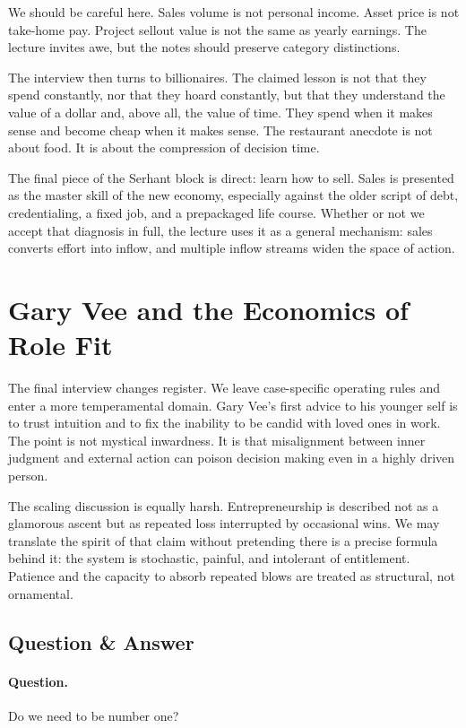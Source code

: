 We should be careful here. Sales volume is not personal income. Asset price is not take-home pay. Project sellout value is not the same as yearly earnings. The lecture invites awe, but the notes should preserve category distinctions.

The interview then turns to billionaires. The claimed lesson is not that they spend constantly, nor that they hoard constantly, but that they understand the value of a dollar and, above all, the value of time. They spend when it makes sense and become cheap when it makes sense. The restaurant anecdote is not about food. It is about the compression of decision time.

The final piece of the Serhant block is direct: learn how to sell. Sales is presented as the master skill of the new economy, especially against the older script of debt, credentialing, a fixed job, and a prepackaged life course. Whether or not we accept that diagnosis in full, the lecture uses it as a general mechanism: sales converts effort into inflow, and multiple inflow streams widen the space of action.

\section{Gary Vee and the Economics of Role Fit}

The final interview changes register. We leave case-specific operating rules and enter a more temperamental domain. Gary Vee's first advice to his younger self is to trust intuition and to fix the inability to be candid with loved ones in work. The point is not mystical inwardness. It is that misalignment between inner judgment and external action can poison decision making even in a highly driven person.

The scaling discussion is equally harsh. Entrepreneurship is described not as a glamorous ascent but as repeated loss interrupted by occasional wins. We may translate the spirit of that claim without pretending there is a precise formula behind it: the system is stochastic, painful, and intolerant of entitlement. Patience and the capacity to absorb repeated blows are treated as structural, not ornamental.

\subsection{Question \& Answer}

\paragraph{Question.} Do we need to be number one?

